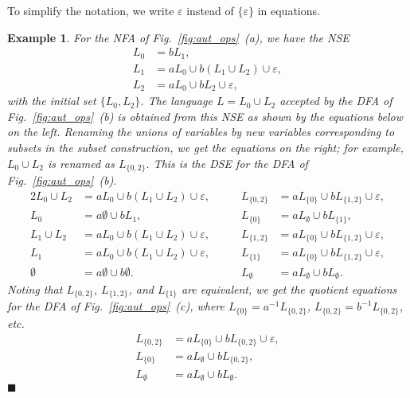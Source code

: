 \documentclass[preprint,12pt]{elsarticle}
\newcommand{\eps}{\varepsilon}
\newcommand{\emp}{\emptyset}
\newcommand{\etc}{\mbox{\it etc.}}
\newcommand{\qedb}{\hfill$\blacksquare$}
\newtheorem{example}{Example}
\begin{document}
To simplify the notation, we write $\eps$ instead of $\{\eps\}$ in  equations.
\begin{example}
\label{ex:NSE}
For the NFA of Fig.~\ref{fig:aut_ops}~(a), we have the NSE 
\begin{displaymath}
 \begin{array}{rl}
   L_0&=  bL_1, \\
   L_1&= aL_0 \cup b(L_1 \cup L_2)   \cup \eps, \\
   L_2&= aL_0\cup bL_2 \cup \eps, 
 \end{array}
\end{displaymath}
with the initial set 
$\{L_0,L_2\}$.
The language $L=L_0\cup L_2$ accepted by the DFA of Fig.~\ref{fig:aut_ops}~(b) 
is obtained  from this NSE as shown by the equations below on the left. 
Renaming the unions of variables by new variables corresponding to subsets in 
the subset construction, we get the equations on the right;
for example, $L_0\cup L_2$ is renamed as $L_{\{0,2\}}$.
This is
the DSE for the DFA of Fig.~\ref{fig:aut_ops}~(b). 
\begin{alignat*}{2}
 L_0\cup L_2&= aL_0 \cup b(L_1\cup L_2) \cup\eps,
	\qquad 	&L_{\{0,2\}}&= aL_{\{0\}} \cup b L_{\{1,2\}} \cup \eps, \\
 L_0&= a\emp\cup bL_1, & 
 	L_{\{0\}}&= aL_{\emp}\cup bL_{\{1\}},\\
 L_1\cup L_2&= aL_0 \cup b(L_1\cup L_2)  \cup \eps, &
 	 L_{\{1,2\}}&= aL_{\{0\}} \cup bL_{\{1,2\}}  \cup \eps, \\
L_1&= aL_0\cup b(L_1\cup L_2) \cup \eps, &
	L_{\{1\}}&= aL_{\{0\}}\cup bL_{\{1,2\}} \cup \eps,\\
\emp&= a\emp\cup b\emp.  &    L_{\emp}&= aL_{\emp}\cup bL_{\emp}.  
		\end{alignat*}
 Noting that $L_{\{0,2\}}$, $L_{\{1,2\}}$, and $L_{\{1\}}$ are equivalent, 
we get the quotient equations for the DFA of Fig.~\ref{fig:aut_ops}~(c), 
where $L_{\{0\}}=a^{-1}L_{\{0,2\}}$, $L_{\{0,2\}}=b^{-1}L_{\{0,2\}}$, \etc
\begin{displaymath}
 \begin{array}{rl}
   L_{\{0,2\}}&= aL_{\{0\}} \cup b L_{\{0,2\}} \cup \eps, \\
     L_{\{0\}}&= aL_{\emp}\cup bL_{\{0,2\}}, \\
   L_{\emp}&= aL_{\emp}\cup bL_{\emp}. 
 \end{array}  
\end{displaymath}  
\qedb\end{example}
\end{document}

